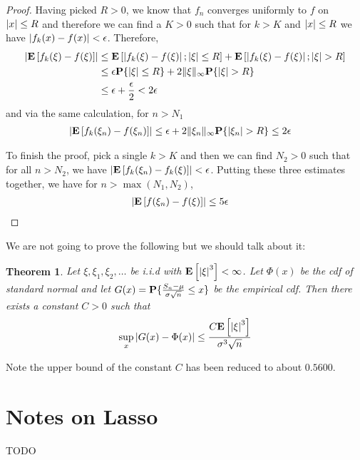 \documentclass{amsart}
\newtheorem{thm}{Theorem}[section]
\theoremstyle{remark}
\theoremstyle{definition}
\begin{document}
\begin{proof}
Having picked $R>0$, we know that $f_n$ converges uniformly to $f$ on
$\left \vert x \right \vert \leq R$ and therefore we can find a $K > 0$ such that for $k
> K$ and $\left \vert x \right \vert \leq R$  we have $\left \vert f_k(x) - f(x) \right \vert < \epsilon$.
Therefore,
\begin{align*}
\left \vert \textbf{E}\left[f_k(\xi) - f(\xi)\right] \right \vert &\leq \textbf{E}\left[\left \vert f_k(\xi)
    - f(\xi) \right \vert ; \left \vert \xi \right \vert \leq R\right] + \textbf{E}\left[\left \vert f_k(\xi)
    - f(\xi) \right \vert ; \left \vert \xi \right \vert > R\right] \\
&\leq \epsilon \textbf{P}\{ \left \vert \xi \right \vert \leq R\} + 2\lVert \xi \rVert_\infty \textbf{P}\{ \left \vert \xi \right \vert > R\} \\
&\leq \epsilon + \frac{\epsilon}{2} < 2\epsilon
\end{align*}
and via the same calculation, for $n > N_1$
\begin{align*}
\left \vert \textbf{E}\left[f_k(\xi_n) - f(\xi_n)\right] \right \vert &\leq \epsilon + 2\lVert \xi_n \rVert_\infty \textbf{P}\{ \left \vert \xi_n \right \vert > R\} \leq 2\epsilon
\end{align*}

To finish the proof, pick a single $k > K$ and then we can find $N_2 >
0$ such that for all $n > N_2$, we have $\left \vert \textbf{E}\left[f_k(\xi_n)
    - f_k(\xi)\right] \right \vert < \epsilon$.  Putting these three estimates together,
we have for $n > \max(N_1, N_2)$, 
\begin{align*}
\left \vert \textbf{E}\left[f(\xi_n) - f(\xi)\right] \right \vert &\leq 5 \epsilon
\end{align*}
\end{proof}

We are not going to prove the following but we should talk about it:
\begin{thm}\label{Berry-Esseen Theorem}Let $\xi, \xi_1, \xi_2, \dots$
  be i.i.d with $\textbf{E}\left[\left \vert \xi \right \vert^3\right] < \infty$.  Let $\Phi(x)$
  be the cdf of standard normal and let $G(x) = \textbf{P}\{\frac{S_n
      - \mu}{\sigma\sqrt{n}} \leq x\}$ be the empirical cdf.  Then
  there exists a constant $C > 0$ such that
\begin{align*}
\sup_x \left \vert G(x) - \Phi(x) \right \vert \leq \frac{C
  \textbf{E}\left[\left \vert \xi \right \vert^3\right]}{\sigma^3 \sqrt{n}}
\end{align*}
\end{thm}
Note the upper bound of the constant $C$ has been reduced to about
$0.5600$.  







\section{Notes on Lasso}
TODO
\end{document}
